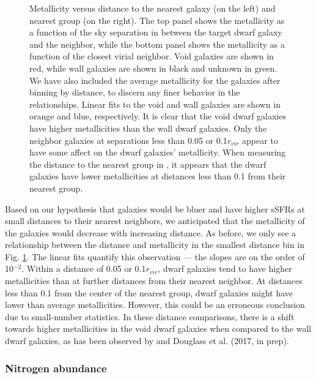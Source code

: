 \begin{figure}
    \caption[Metallicity versus distance to nearest neighbor and group]
    {Metallicity versus distance to the nearest galaxy (on the left) and nearest 
    group (on the right).  The top panel shows the metallicity as a function of 
    the sky separation in \hMpc between the target dwarf galaxy and the 
    neighbor, while the bottom panel shows the metallicity as a function of the 
    closest virial neighbor.  Void galaxies are shown in red, while wall 
    galaxies are shown in black and unknown in green.  We have also included the 
    average metallicity for the galaxies after binning by distance, to discern 
    any finer behavior in the relationships.  Linear fits to the void and wall 
    galaxies are shown in orange and blue, respectively.  It is clear that the 
    void dwarf galaxies have higher metallicities than the wall dwarf galaxies.  
    Only the neighbor galaxies at separations less than 0.05 \hMpc or 
    0.1$r_{vir}$ appear to have some affect on the dwarf galaxies' metallicity.  
    When measuring the distance to the nearest group in \hMpc, it appears that 
    the dwarf galaxies have lower metallicities at distances less than 0.1 \hMpc 
    from their nearest group.}
    \label{fig:OH}
\end{figure}

Based on our hypothesis that galaxies would be bluer and have higher sSFRs at 
small distances to their nearest neighbors, we anticipated that the metallicity 
of the galaxies would decrease with increasing distance.  As before, we only see 
a relationship between the distance and metallicity in the smallest distance 
bin in Fig. \ref{fig:OH}.  The linear fits quantify this observation --- the 
slopes are on the order of 10$^{-2}$.  Within a distance of 0.05 \hMpc or 
0.1$r_{vir}$, dwarf galaxies tend to have higher metallicities than at further 
distances from their nearest neighbor.  At distances less than 0.1 \hMpc from 
the center of the nearest group, dwarf galaxies might have lower than average 
metallicities.  However, this could be an erroneous conclusion due to 
small-number statistics.  In these distance comparisons, there is a shift 
towards higher metallicities in the void dwarf galaxies when compared to the 
wall dwarf galaxies, as has been observed by \cite{Douglass17b} and Douglass et 
al. (2017, in prep).  


\subsubsection{Nitrogen abundance}

